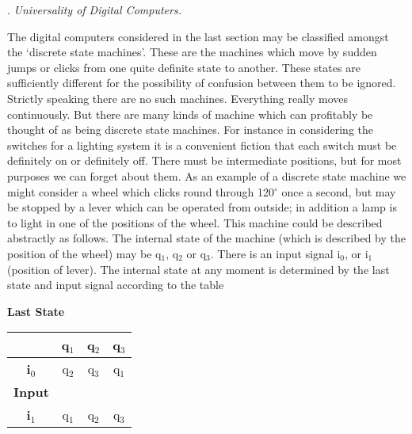 \documentclass[10pt]{article} %
\begin{document}
\vspace{0.5\baselineskip} %
\noindent{}. \textit{Universality of Digital Computers.}
\vspace{0.5\baselineskip} %

The digital computers considered in the last section may be classified amongst the `discrete state machines'. These are the machines which move by sudden jumps or clicks from one quite definite state to another. These states are sufficiently different for the possibility of confusion between them to be ignored. Strictly speaking there are no such machines. Everything really moves continuously. But there are many kinds of machine which can profitably be thought of as being discrete state machines. For instance in considering the switches for a lighting system it is a convenient fiction that each switch must be definitely on or definitely off. There must be intermediate positions, but for most purposes we can forget about them. As an example of a discrete state machine we might consider a wheel which clicks round through 120$^\circ$ once a second, but may be stopped by a lever which can be operated from outside; in addition a lamp is to light in one of the positions of the wheel. This machine could be described abstractly as follows. The internal state of the machine (which is described by the position of the wheel) may be q$_1$, q$_2$ or q$_3$. There is an input signal i$_0$, or i$_1$ (position of lever). The internal state at any moment is determined by the last state and input signal according to the table
\vspace{0.5\baselineskip} %

\begin{center}
    \normalfont %
    \textbf{Last State} \\
    \begin{tabular}{|c|c|c|c|}
        \hline
        \multicolumn{1}{|c|}{} & \textbf{q$_1$} & \textbf{q$_2$} & \textbf{q$_3$} \\
        \hline
        \textbf{i$_0$} & q$_2$ & q$_3$ & q$_1$ \\
        \cline{2-4}
        \textbf{Input} & & & \\ %
        \cline{1-1} %
        \textbf{i$_1$} & q$_1$ & q$_2$ & q$_3$ \\
        \hline
    \end{tabular}
\end{center}
\vspace{0.5\baselineskip} %
\end{document}
